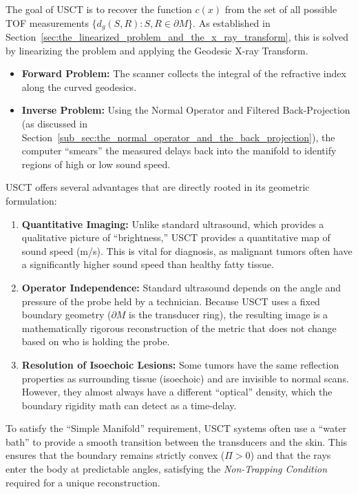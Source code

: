The goal of USCT is to recover the function $c(x)$ from the set of all possible TOF measurements $\{d_g(S, R) : S, R \in \partial M\}$. As established in Section~\ref{sec:the_linearized_problem_and_the_x_ray_transform}, this is solved by linearizing the problem and applying the Geodesic X-ray Transform.

\begin{itemize}
  \item \textbf{Forward Problem:} The scanner collects the integral of the refractive index along the curved geodesics.
  \item \textbf{Inverse Problem:} Using the Normal Operator and Filtered Back-Projection (as discussed in Section~\ref{sub_sec:the_normal_operator_and_the_back_projection}), the computer ``smears'' the measured delays back into the manifold to identify regions of high or low sound speed.
\end{itemize}

USCT offers several advantages that are directly rooted in its geometric formulation:
\begin{enumerate}
  \item \textbf{Quantitative Imaging:} Unlike standard ultrasound, which provides a qualitative picture of ``brightness,'' USCT provides a quantitative map of sound speed (m/s). This is vital for diagnosis, as malignant tumors often have a significantly higher sound speed than healthy fatty tissue.
  \item \textbf{Operator Independence:} Standard ultrasound depends on the angle and pressure of the probe held by a technician. Because USCT uses a fixed boundary geometry ($\partial M$ is the transducer ring), the resulting image is a mathematically rigorous reconstruction of the metric that does not change based on who is holding the probe.
  \item \textbf{Resolution of Isoechoic Lesions:} Some tumors have the same reflection properties as surrounding tissue (isoechoic) and are invisible to normal scans. However, they almost always have a different ``optical'' density, which the boundary rigidity math can detect as a time-delay.
\end{enumerate}

To satisfy the ``Simple Manifold'' requirement, USCT systems often use a ``water bath'' to provide a smooth transition between the transducers and the skin. This ensures that the boundary remains strictly convex ($\Pi > 0$) and that the rays enter the body at predictable angles, satisfying the \emph{Non-Trapping Condition} required for a unique reconstruction.

